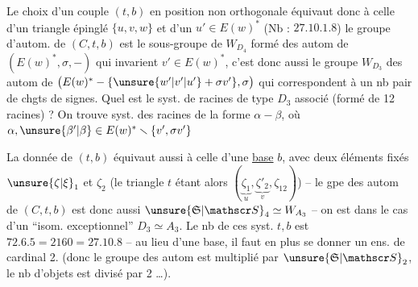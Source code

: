 Le choix d'un couple $(t,b)$ en position non orthogonale équivaut donc à celle d'un triangle épinglé $\{u,v,w\}$ et d'un $u'\in E(w)^*$ (Nb : $27.10.1.8$)
le groupe d'autom. de $(C,t,b)$ est le sous-groupe de $W_{D_4}$ formé des autom de $(E(w)^*,\sigma,-)$ qui invarient $v'\in E(w)^*$, c'est donc aussi le groupe $W_{D_3}$ des autom de $\bigl(E(w)^*-\{\unsure{w'|v'|u'}+ \sigma v'\},\sigma\bigr)$ qui correspondent à un nb pair de chgts de signes. Quel est le syst. de racines de type $D_3$ associé (formé de 12 racines) ? On trouve  syst. des racines de la forme $\alpha-\beta$, où $\alpha,\unsure{\beta'|\beta}\in E(w)^*\smallsetminus\{v',\sigma v'\}$ 

La donnée de $(t,b)$ équivaut aussi à celle d'une \uline{base} $b$, avec deux éléments fixés $\unsure{\zeta|\xi}_1$ et $\zeta_2$ (le triangle $t$ étant alors $(\underset{u}{\underbrace{\zeta_1}},\underset{v}{\underbrace{\zeta'_2}},\zeta_{12})$) -- le gpe des autom de $(C,t,b)$ est donc aussi $\unsure{\mathfrak S|\mathscr S}_4\simeq W_{A_3}$ -- on est dans le cas d'un ``isom. exceptionnel'' $D_3\simeq A_3$. Le nb de ces syst. $t,b$ est $72.6.5=2160=27.10.8$ --
au lieu d'une base, il faut en plus se donner un ens. de cardinal 2. (donc le groupe des autom est multiplié par $\unsure{\mathfrak S|\mathscr S}_2$, le nb d'objets est divisé par 2 \ldots).

